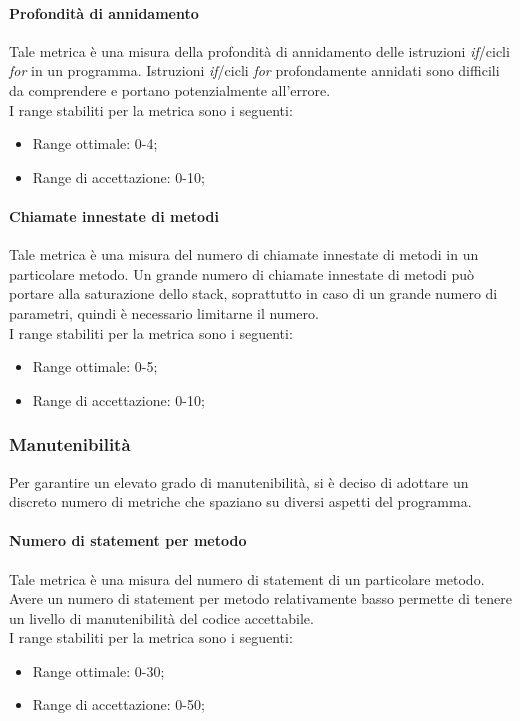			\paragraph{Profondità di annidamento}
			Tale metrica è una misura della profondità di annidamento delle istruzioni \textit{if}/cicli \textit{for} in un programma. Istruzioni \textit{if}/cicli \textit{for} profondamente annidati sono difficili da comprendere e portano potenzialmente all'errore.
			\\I range stabiliti per la metrica sono i seguenti:
			\begin{itemize}
				\item Range ottimale: 0-4;
				\item Range di accettazione: 0-10;
			\end{itemize}
			
			\paragraph{Chiamate innestate di metodi}
			Tale metrica è una misura del numero di chiamate innestate di metodi in un particolare metodo. Un grande numero di chiamate innestate di metodi può portare alla saturazione dello stack, soprattutto in caso di un grande numero di parametri, quindi è necessario limitarne il numero.
			\\I range stabiliti per la metrica sono i seguenti:
			\begin{itemize}
				\item Range ottimale: 0-5;
				\item Range di accettazione: 0-10;
			\end{itemize}
		\subsubsection{Manutenibilità \label{S4}}
		Per garantire un elevato grado di manutenibilità, si è deciso di adottare un discreto numero di metriche che spaziano su diversi aspetti del programma.
			\paragraph{Numero di statement per metodo}
			Tale metrica è una misura del numero di statement di un particolare metodo. Avere un numero di statement per metodo relativamente basso permette di tenere un livello di manutenibilità del codice accettabile.
			\\I range stabiliti per la metrica sono i seguenti:
			\begin{itemize}
				\item Range ottimale: 0-30;
				\item Range di accettazione: 0-50;
			\end{itemize}
			
